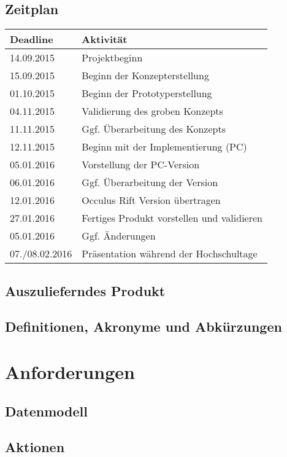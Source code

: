 \documentclass{Ausarbeitung}
\begin{document}
	\subsection{Zeitplan}
			\label{plan}
			\begin{tabular}{@{}ll@{}}
				\hline
				Deadline   & Aktivität                       \\ \hline
				14.09.2015 & Projektbeginn                   \\
				15.09.2015 & Beginn der Konzepterstellung    \\
				01.10.2015 & Beginn der Prototyperstellung   \\ 
				04.11.2015 & Validierung des groben Konzepts \\ 
				11.11.2015 & Ggf. Überarbeitung des Konzepts \\
				12.11.2015 & Beginn mit der Implementierung (PC) \\
				05.01.2016 & Vorstellung der PC-Version \\
				06.01.2016 & Ggf. Überarbeitung der Version \\
				12.01.2016 & Occulus Rift Version übertragen \\
				27.01.2016 & Fertiges Produkt vorstellen und validieren \\
				05.01.2016 & Ggf. Änderungen \\
				07./08.02.2016 & Präsentation während der Hochschultage \\ \hline
			\end{tabular}
	\subsection{Auszulieferndes Produkt}
	\label{produkt}
	\subsection{Definitionen, Akronyme und Abkürzungen}
	\label{glossar}
\clearpage
\section{Anforderungen}
\label{anforderungen}
	\subsection{Datenmodell}
	\label{datenmodell}
	\subsection{Aktionen}
	\label{aktionen}
\end{document}
